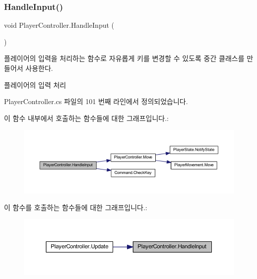 \subsubsection{\texorpdfstring{HandleInput()}{HandleInput()}}
{\footnotesize\ttfamily void Player\+Controller.\+Handle\+Input (\begin{DoxyParamCaption}{ }\end{DoxyParamCaption})}



플레이어의 입력을 처리하는 함수로 자유롭게 키를 변경할 수 있도록 중간 클래스를 만들어서 사용한다. 

플레이어의 입력 처리 

Player\+Controller.\+cs 파일의 101 번째 라인에서 정의되었습니다.


\begin{DoxyCode}{0}

\end{DoxyCode}
이 함수 내부에서 호출하는 함수들에 대한 그래프입니다.\+:
\nopagebreak
\begin{figure}[H]
\begin{center}
\leavevmode
\includegraphics[width=350pt]{dc/dde/class_player_controller_a5ebfe098b2dc258ca8349e6951766883_cgraph}
\end{center}
\end{figure}
이 함수를 호출하는 함수들에 대한 그래프입니다.\+:
\nopagebreak
\begin{figure}[H]
\begin{center}
\leavevmode
\includegraphics[width=350pt]{dc/dde/class_player_controller_a5ebfe098b2dc258ca8349e6951766883_icgraph}
\end{center}
\end{figure}
